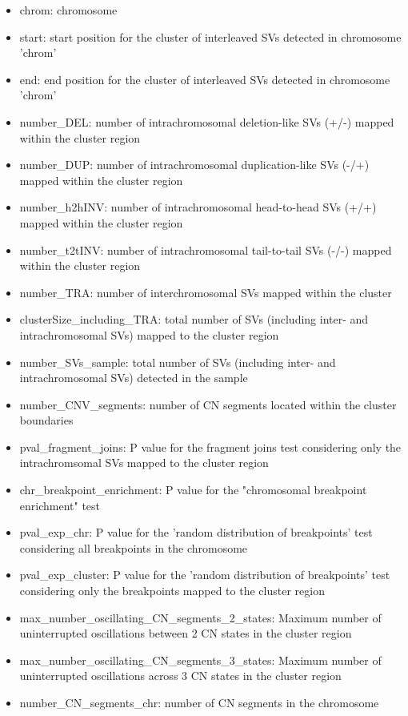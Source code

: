 \documentclass[twoside,a4wide,11pt]{article}\usepackage[]{graphicx}\usepackage[]{color}
\begin{document}
\begin{itemize}
\item chrom: chromosome
\item start: start position for the cluster of interleaved SVs detected in chromosome 'chrom'
\item end: end position for the cluster of interleaved SVs detected in chromosome 'chrom'
\item number\_DEL: number of intrachromosomal deletion-like SVs (+/-) mapped within the cluster region 
\item number\_DUP: number of intrachromosomal duplication-like SVs (-/+) mapped within the cluster region
\item number\_h2hINV: number of intrachromosomal head-to-head SVs (+/+) mapped within the cluster region
\item number\_t2tINV: number of intrachromosomal tail-to-tail SVs (-/-) mapped within the cluster region
\item number\_TRA: number of interchromosomal SVs mapped within the cluster
\item clusterSize\_including\_TRA: total number of SVs (including inter- and intrachromosomal SVs) mapped to the cluster region
\item number\_SVs\_sample: total number of SVs (including inter- and intrachromosomal SVs) detected in the sample
\item number\_CNV\_segments: number of CN segments located within the cluster boundaries
\item pval\_fragment\_joins: P value for the fragment joins test considering only the intrachromsomal SVs mapped to the cluster region
\item chr\_breakpoint\_enrichment: P value for the "chromosomal breakpoint enrichment" test
\item pval\_exp\_chr: P value for the 'random distribution of breakpoints' test considering all breakpoints in the  chromosome
\item pval\_exp\_cluster: P value for the 'random distribution of breakpoints' test considering only the breakpoints mapped to the cluster region
\item max\_number\_oscillating\_CN\_segments\_2\_states: Maximum number of uninterrupted oscillations between 2 CN states in the cluster region
\item max\_number\_oscillating\_CN\_segments\_3\_states: Maximum number of uninterrupted oscillations across 3 CN states in the cluster region
\item number\_CN\_segments\_chr: number of CN segments in the chromosome 

\end{itemize}
\end{document}
